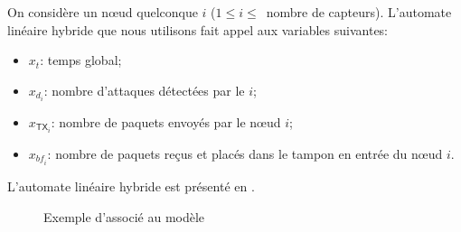 On considère un nœud quelconque $i$ ($1\leq i\leq$~nombre de capteurs).
L'automate linéaire hybride que nous utilisons fait appel aux variables suivantes:
\begin{itemize}
    \item $x_t$: temps global;
    \item $x_{d_i}$: nombre d'attaques détectées par le \cn $i$;
    \item $x_{\mathsf{TX}_i}$: nombre de paquets envoyés par le nœud $i$;
    \item $x_{\mathit{bf}_i}$: nombre de paquets reçus et placés dans le tampon en entrée du nœud $i$.
\end{itemize}
L'automate linéaire hybride est présenté en .
\begin{figure}[!ht]
    \caption{Exemple d'\alh associé au modèle \rpsge}\label{sa:fig:lha}
\end{figure}
